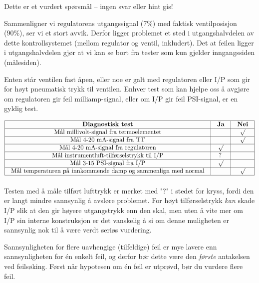 Dette er et vurdert spørsmål -- ingen svar eller hint gis!







Sammenligner vi regulatorens utgangssignal (7\%) med faktisk ventilposisjon (90\%), ser vi et stort avvik.  Derfor ligger problemet et sted i utgangshalvdelen av dette kontrollsystemet (mellom regulator og ventil, inkludert).  Det at feilen ligger i utgangshalvdelen gjør at vi kan se bort fra tester som kun gjelder inngangssiden (målesiden).

\vskip 10pt

Enten står ventilen fast åpen, eller noe er galt med regulatoren eller I/P som gir for høyt pneumatisk trykk til ventilen.  Enhver test som kan hjelpe oss å avgjøre om regulatoren gir feil milliamp-signal, eller om I/P gir feil PSI-signal, er en gyldig test.


$$\vbox{\offinterlineskip
\halign{\strut
\vrule \quad\hfil # \ \hfil & 
\vrule \quad\hfil # \ \hfil & 
\vrule \quad\hfil # \ \hfil \vrule \cr
\noalign{\hrule}
%
{\bf Diagnostisk test} & {\bf Ja} & {\bf Nei} \cr
%
\noalign{\hrule}
%
Mål millivolt-signal fra termoelementet &  & $\surd$ \cr
%
\noalign{\hrule}
%
Mål 4-20 mA-signal fra TT &  & $\surd$ \cr
%
\noalign{\hrule}
%
Mål 4-20 mA-signal fra regulatoren & $\surd$ &  \cr
%
\noalign{\hrule}
%
Mål instrumentluft-tilførselstrykk til I/P & ? &  \cr
%
\noalign{\hrule}
%
Mål 3-15 PSI-signal fra I/P & $\surd$ &  \cr
%
\noalign{\hrule}
%
Mål temperaturen på innkommende damp og sammenlign med normal &  & $\surd$ \cr
%
\noalign{\hrule}
} %
}$$ %

Testen med å måle tilført lufttrykk er merket med "?" i stedet for kryss, fordi den er langt mindre sannsynlig å avsløre problemet.  For høyt tilførselstrykk {\it kan} skade I/P slik at den gir høyere utgangstrykk enn den skal, men uten å vite mer om I/P sin interne konstruksjon er det vanskelig å si om denne muligheten er sannsynlig nok til å være verdt seriøs vurdering.

\vskip 10pt

Sannsynligheten for flere uavhengige (tilfeldige) feil er mye lavere enn sannsynligheten for én enkelt feil, og derfor bør dette være den {\it første} antakelsen ved feilsøking.  Først når hypotesen om én feil er utprøvd, bør du vurdere flere feil.



